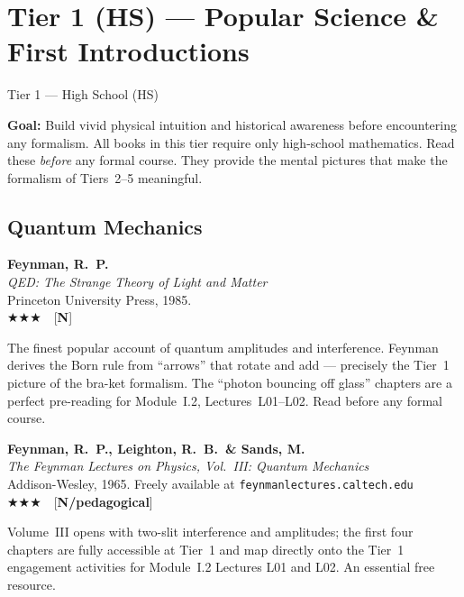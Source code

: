 \documentclass[11pt,a4paper]{article}
\newcommand{\essential}{$\bigstar\bigstar\bigstar$}
\newenvironment{bibentry}[1]{%
  \begin{tcolorbox}[entrybox=#1, top=4pt, bottom=4pt]%
}{%
  \end{tcolorbox}\smallskip%
}
\begin{document}
\newpage

\section{Tier 1 (HS) --- Popular Science \& First Introductions}
\label{sec:t1}

\begin{tcolorbox}[tierheader=t1green]
Tier 1 --- High School (HS)
\end{tcolorbox}

\medskip
\begin{tcolorbox}[keybox]
\textbf{Goal:} Build vivid physical intuition and historical awareness before
encountering any formalism. All books in this tier require only high-school mathematics.
Read these \emph{before} any formal course. They provide the mental pictures that make
the formalism of Tiers~2--5 meaningful.
\end{tcolorbox}

\subsection{Quantum Mechanics}

\begin{bibentry}{t1light}
\textbf{Feynman, R.~P.}\\
\textit{QED: The Strange Theory of Light and Matter}\\
Princeton University Press, 1985.\\[4pt]
\essential\ \ [\textbf{N}]\\[4pt]
\begin{tcolorbox}[annotbox]
The finest popular account of quantum amplitudes and interference. Feynman derives
the Born rule from ``arrows'' that rotate and add --- precisely the Tier~1 picture
of the bra-ket formalism. The ``photon bouncing off glass'' chapters are a perfect
pre-reading for Module~I.2, Lectures~L01--L02. Read before any formal course.
\end{tcolorbox}
\end{bibentry}

\begin{bibentry}{t1light}
\textbf{Feynman, R.~P., Leighton, R.~B.\ \& Sands, M.}\\
\textit{The Feynman Lectures on Physics, Vol.~III: Quantum Mechanics}\\
Addison-Wesley, 1965. Freely available at \texttt{feynmanlectures.caltech.edu}\\[4pt]
\essential\ \ [\textbf{N/pedagogical}]\\[4pt]
\begin{tcolorbox}[annotbox]
Volume~III opens with two-slit interference and amplitudes; the first four chapters
are fully accessible at Tier~1 and map directly onto the Tier~1 engagement activities
for Module~I.2 Lectures L01 and L02. An essential free resource.
\end{tcolorbox}
\end{bibentry}
\end{document}
